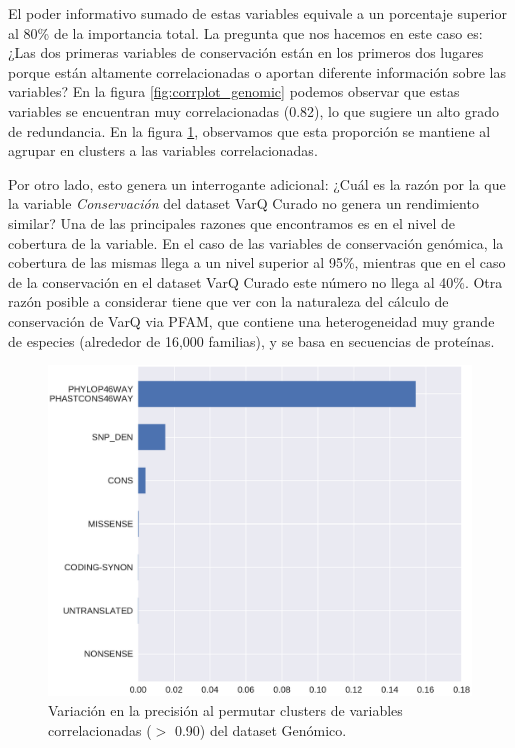 El poder informativo sumado de estas variables equivale a un porcentaje superior al 80\% de la importancia total. La pregunta que nos hacemos en este caso es: ¿Las dos primeras variables de conservación están en los primeros dos lugares porque están altamente correlacionadas o aportan diferente información sobre las variables? En la figura \ref{fig:corrplot_genomic} podemos observar que estas variables se encuentran muy correlacionadas (0.82), lo que sugiere un alto grado de redundancia. En la figura \ref{fig:importance_genomic_cluster}, observamos que esta proporción se mantiene al agrupar en clusters a las variables correlacionadas.

Por otro lado, esto genera un interrogante adicional: ¿Cuál es la razón por la que la variable \textit{Conservación} del dataset VarQ Curado no genera un rendimiento similar? Una de las principales razones que encontramos es en el nivel de cobertura de la variable. En el caso de las variables de conservación genómica, la cobertura de las mismas llega a un nivel superior al 95\%, mientras que en el caso de la conservación en el dataset VarQ Curado este número no llega al 40\%.  Otra razón posible a considerar tiene que ver con la naturaleza del cálculo de conservación de VarQ via PFAM, que contiene una heterogeneidad muy grande de especies (alrededor de 16,000 familias), y se basa en secuencias de proteínas.

\begin{figure}[H]
    \centering
    \includegraphics[scale=0.7]{documents/latex/figures/3/genomic/genomic_importance_cluster.pdf}
    \caption{Variación en la precisión al permutar clusters de variables correlacionadas ($>$ 0.90) del dataset Genómico.}
    \label{fig:importance_genomic_cluster}
\end{figure}


